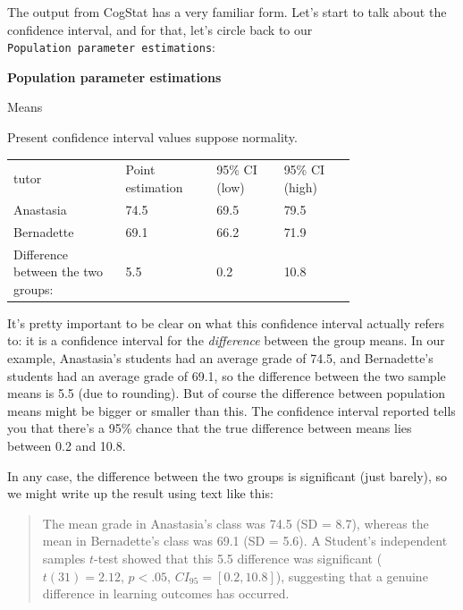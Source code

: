 \documentclass[
]{book}
\theoremstyle{definition}
\theoremstyle{definition}
\theoremstyle{definition}
\theoremstyle{definition}
\theoremstyle{remark}
\begin{document}
The output from CogStat has a very familiar form. Let's start to talk about the confidence interval, and for that, let's circle back to our \texttt{Population\ parameter\ estimations}:

\begin{tcolorbox}[colback=white,
  colframe=lightgray,
  coltext=black,
  boxsep=4pt,
  boxrule=0.3pt,
  arc=0pt]
  {  \sffamily
     \color{CSblue}\textbf{Population parameter estimations}

    \color{black}
    Means
    
    Present confidence interval values suppose normality.

    \begin{longtable}[l]{m{0.25\linewidth}p{0.2\linewidth}p{0.15\linewidth}p{0.16\linewidth}}
    \endhead
    tutor
    & Point estimation 
    & 95\% CI (low) 
    & 95\% CI (high) \\
    Anastasia & 74.5 & 69.5 & 79.5 \\
    Bernadette & 69.1 & 66.2 & 71.9 \\
    Difference between the two groups: & 5.5 & 0.2 & 10.8 \\
    \end{longtable}
  }
\end{tcolorbox}

It's pretty important to be clear on what this confidence interval actually refers to: it is a confidence interval for the \emph{difference} between the group means. In our example, Anastasia's students had an average grade of 74.5, and Bernadette's students had an average grade of 69.1, so the difference between the two sample means is 5.5 (due to rounding). But of course the difference between population means might be bigger or smaller than this. The confidence interval reported tells you that there's a 95\% chance that the true difference between means lies between 0.2 and 10.8.

In any case, the difference between the two groups is significant (just barely), so we might write up the result using text like this:

\begin{quote}
The mean grade in Anastasia's class was 74.5 (SD = 8.7), whereas the mean in Bernadette's class was 69.1 (SD = 5.6). A Student's independent samples \(t\)-test showed that this 5.5 difference was significant (\(t(31) = 2.12\), \(p<.05\), \(CI_{95} = [0.2, 10.8]\)), suggesting that a genuine difference in learning outcomes has occurred.
\end{quote}
\end{document}
